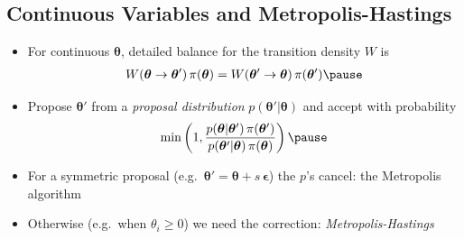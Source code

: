\begin{slide}
\section[-2]{Continuous Variables and Metropolis-Hastings}

\begin{PauseHighLight}
  \begin{itemize}
  \item For continuous $\bm{\theta}$, detailed balance for the
    transition density $W$ is
    \begin{align*}
      W(\bm{\theta}\rightarrow \bm{\theta}')\, \pi(\bm{\theta}) =
      W(\bm{\theta}'\rightarrow \bm{\theta})\, \pi(\bm{\theta}') \pause
    \end{align*}
  \item Propose $\bm{\theta}'$ from a \emph{proposal distribution}
    $p(\bm{\theta}'|\bm{\theta})$ and accept with probability
    \begin{align*}
      \min\left(1, \frac{p(\bm{\theta}|\bm{\theta}')\,\pi(\bm{\theta}')}
      {p(\bm{\theta}'|\bm{\theta})\,\pi(\bm{\theta})}\right)\pause
    \end{align*}
  \item For a symmetric proposal (e.g.\ $\bm{\theta}' = \bm{\theta} +
    s\,\bm{\epsilon}$) the $p$'s cancel: the Metropolis algorithm\pause
  \item Otherwise (e.g.\ when $\theta_i\geq0$) we need the correction:
    \emph{Metropolis-Hastings}\pause
  \end{itemize}
\end{PauseHighLight}

\end{slide}


